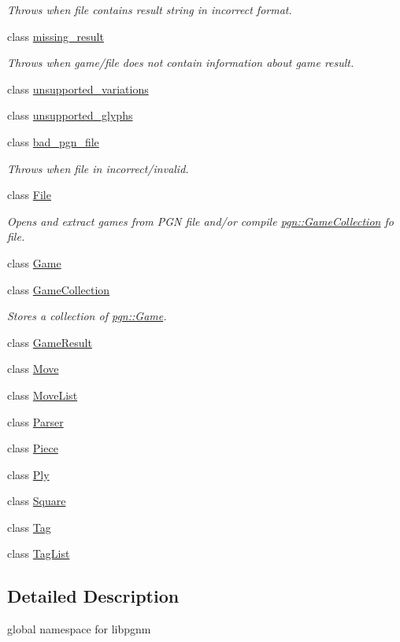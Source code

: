 \begin{DoxyCompactItemize}
\begin{DoxyCompactList}\small\item\em Throws when file contains result string in incorrect format. \item\end{DoxyCompactList}\item 
class \hyperlink{classpgn_1_1missing__result}{missing\_\-result}
\begin{DoxyCompactList}\small\item\em Throws when game/file does not contain information about game result. \item\end{DoxyCompactList}\item 
class \hyperlink{classpgn_1_1unsupported__variations}{unsupported\_\-variations}
\item 
class \hyperlink{classpgn_1_1unsupported__glyphs}{unsupported\_\-glyphs}
\item 
class \hyperlink{classpgn_1_1bad__pgn__file}{bad\_\-pgn\_\-file}
\begin{DoxyCompactList}\small\item\em Throws when file in incorrect/invalid. \item\end{DoxyCompactList}\item 
class \hyperlink{classpgn_1_1File}{File}
\begin{DoxyCompactList}\small\item\em Opens and extract games from PGN file and/or compile \hyperlink{classpgn_1_1GameCollection}{pgn::GameCollection} fo file. \item\end{DoxyCompactList}\item 
class \hyperlink{classpgn_1_1Game}{Game}
\item 
class \hyperlink{classpgn_1_1GameCollection}{GameCollection}
\begin{DoxyCompactList}\small\item\em Stores a collection of \hyperlink{classpgn_1_1Game}{pgn::Game}. \item\end{DoxyCompactList}\item 
class \hyperlink{classpgn_1_1GameResult}{GameResult}
\item 
class \hyperlink{classpgn_1_1Move}{Move}
\item 
class \hyperlink{classpgn_1_1MoveList}{MoveList}
\item 
class \hyperlink{classpgn_1_1Parser}{Parser}
\item 
class \hyperlink{classpgn_1_1Piece}{Piece}
\item 
class \hyperlink{classpgn_1_1Ply}{Ply}
\item 
class \hyperlink{classpgn_1_1Square}{Square}
\item 
class \hyperlink{classpgn_1_1Tag}{Tag}
\item 
class \hyperlink{classpgn_1_1TagList}{TagList}
\end{DoxyCompactItemize}


\subsection{Detailed Description}
global namespace for libpgnm 
